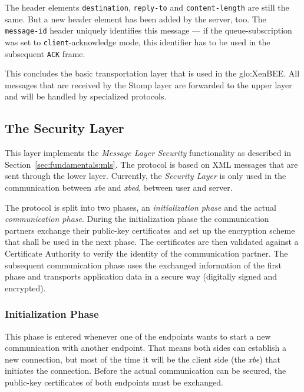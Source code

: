 The   header    elements   \texttt{destination},   \texttt{reply-to}   and
\texttt{content-length} are still  the same. But a new  header element has
been added  by the server,  too.  The \texttt{message-id}  header uniquely
identifies  this  message  ---   if  the  queue-subscription  was  set  to
\texttt{client}-acknowledge mode,  this identifier has  to be used  in the
subsequent \texttt{ACK} frame.

\medskip

This  concludes  the  basic  transportation  layer that  is  used  in  the
\gls{glo:XenBEE}. All  messages that are  received by the Stomp  layer are
forwarded to the upper layer and will be handled by specialized protocols.

\subsection{The Security Layer}
\label{sec:protocol:security}

This layer  implements the \emph{Message Layer  Security} functionality as
described in Section~\ref{sec:fundamentals:mls}.  The protocol is based on
XML  messages that  are  sent  through the  lower  layer.  Currently,  the
\emph{Security Layer} is only used in the communication between \emph{xbe}
and \emph{xbed}, \ie between user and server.

The protocol is split into  two phases, an \emph{initialization phase} and
the actual \emph{communication phase}. During the initialization phase the
communication partners  exchange their public-key certificates  and set up
the  encryption  scheme  that  shall  be  used in  the  next  phase.   The
certificates are then validated  against a Certificate Authority to verify
the identity  of the  communication partner. The  subsequent communication
phase uses  the exchanged  information of the  first phase  and transports
application data in a secure way (\ie digitally signed and encrypted).

\subsubsection{Initialization Phase}

This phase is  entered whenever one of the endpoints wants  to start a new
communication with another endpoint. That means both sides can establish a
new connection, but most  of the time it will be the  client side (\eg the
\emph{xbe}) that initiates the connection. Before the actual communication
can  be secured,  the public-key  certificates of  both endpoints  must be
exchanged.

